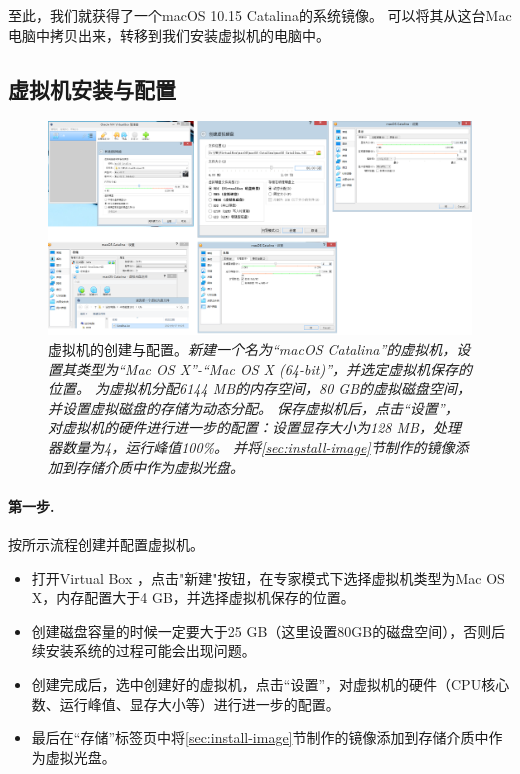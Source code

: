 \documentclass[final]{cvpr}
\newcommand{\mypara}[1]{\paragraph{#1.}}
\begin{document}
至此，我们就获得了一个macOS 10.15 Catalina的系统镜像。
可以将其从这台Mac电脑中拷贝出来，转移到我们安装虚拟机的电脑中。


\subsection{\textbf{虚拟机安装与配置}}

\begin{figure}[t]
  \centering
  \includegraphics[width=\textwidth]{config.pdf}
  \caption{虚拟机的创建与配置。\textit{新建一个名为“macOS Catalina”的虚拟机，设置其类型为“Mac OS X”-“Mac OS X (64-bit)”，并选定虚拟机保存的位置。
  为虚拟机分配6144 MB的内存空间，80 GB的虚拟磁盘空间，并设置虚拟磁盘的存储为动态分配。
  保存虚拟机后，点击“设置”，对虚拟机的硬件进行进一步的配置：设置显存大小为128 MB，处理器数量为4，运行峰值100\%。
  并将\ref{sec:install-image}节制作的镜像添加到存储介质中作为虚拟光盘。 }}\label{fig:config}
\end{figure}

\mypara{第一步}  按所示流程创建并配置虚拟机。

\begin{itemize}
    \item 打开Virtual Box ，点击"新建"按钮，在专家模式下选择虚拟机类型为Mac OS X，内存配置大于4 GB，并选择虚拟机保存的位置。
    \item 创建磁盘容量的时候一定要大于25 GB（这里设置80GB的磁盘空间），否则后续安装系统的过程可能会出现问题。
    \item 创建完成后，选中创建好的虚拟机，点击“设置”，对虚拟机的硬件（CPU核心数、运行峰值、显存大小等）进行进一步的配置。
    \item 最后在“存储”标签页中将\ref{sec:install-image}节制作的镜像添加到存储介质中作为虚拟光盘。
\end{itemize}
\end{document}
